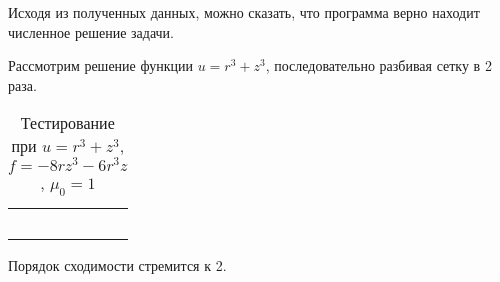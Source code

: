 Исходя из полученных данных, можно сказать, что программа верно находит численное решение задачи.

Рассмотрим решение функции $u = r^3 + z^3$, последовательно разбивая сетку в 2 раза. 

\begin{table}
	\caption{Тестирование при $u = r^3 + z^3$, $f = -8rz^3 - 6r^3 z$, $\mu_0 = 1$}
	\centering
	\small
	\begin{tabularx}{1.0\textwidth}{| >{\raggedright\arraybackslash}X | >{\raggedright\arraybackslash}X | >{\raggedright\arraybackslash}X |>{\raggedright\arraybackslash}X |}
		\hline
		\centering{Количество разбиений} & \centering{Средняя погрешность} & \centering{Порядок сходимости} \tabularnewline \hline		
		
		\centering{2} & \centering{1.7116567E-004}& \centering{-} \tabularnewline \hline
		
		\centering{4} & \centering{5.2066366E-005} & \centering{1.716969754} \tabularnewline \hline
		
		\centering{8} & \centering{1.4089198E-005} & \centering{1.885762274} \tabularnewline \hline
		
		\centering{16} & \centering{3.6602112E-006} & \centering{1.94459064} \tabularnewline \hline
		
		\centering{32} & \centering{9.3301457E-007} & \centering{1.971955381} \tabularnewline \hline
		
	\end{tabularx}
	\label{tab:test11}
\end{table}

Порядок сходимости стремится к 2.